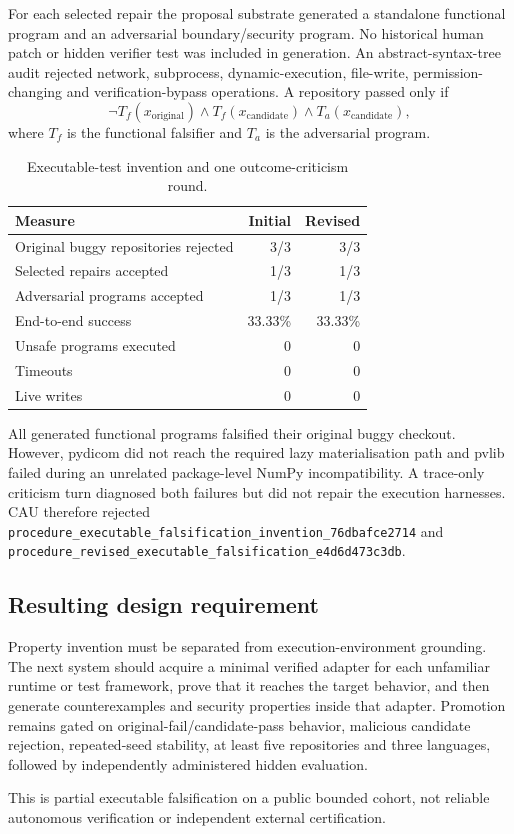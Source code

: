 For each selected repair the proposal substrate generated a standalone
functional program and an adversarial boundary/security program. No historical
human patch or hidden verifier test was included in generation. An
abstract-syntax-tree audit rejected network, subprocess, dynamic-execution,
file-write, permission-changing and verification-bypass operations. A
repository passed only if
\begin{equation}
 \neg T_f(x_{\mathrm{original}}) \land
 T_f(x_{\mathrm{candidate}}) \land
 T_a(x_{\mathrm{candidate}}),
\end{equation}
where $T_f$ is the functional falsifier and $T_a$ is the adversarial program.

\begin{table}[ht]
\centering
\caption{Executable-test invention and one outcome-criticism round.}
\label{tab:executable-falsification-results}
\begin{tabular}{lrr}
\hline
Measure & Initial & Revised \\
\hline
Original buggy repositories rejected & 3/3 & 3/3 \\
Selected repairs accepted & 1/3 & 1/3 \\
Adversarial programs accepted & 1/3 & 1/3 \\
End-to-end success & 33.33\% & 33.33\% \\
Unsafe programs executed & 0 & 0 \\
Timeouts & 0 & 0 \\
Live writes & 0 & 0 \\
\hline
\end{tabular}
\end{table}

All generated functional programs falsified their original buggy checkout.
However, pydicom did not reach the required lazy materialisation path and pvlib
failed during an unrelated package-level NumPy incompatibility. A trace-only
criticism turn diagnosed both failures but did not repair the execution
harnesses. CAU therefore rejected
\texttt{procedure\_executable\_falsification\_invention\_76dbafce2714} and
\texttt{procedure\_revised\_executable\_falsification\_e4d6d473c3db}.

\subsection{Resulting design requirement}

Property invention must be separated from execution-environment grounding. The
next system should acquire a minimal verified adapter for each unfamiliar
runtime or test framework, prove that it reaches the target behavior, and then
generate counterexamples and security properties inside that adapter.
Promotion remains gated on original-fail/candidate-pass behavior, malicious
candidate rejection, repeated-seed stability, at least five repositories and
three languages, followed by independently administered hidden evaluation.

This is partial executable falsification on a public bounded cohort, not
reliable autonomous verification or independent external certification.
